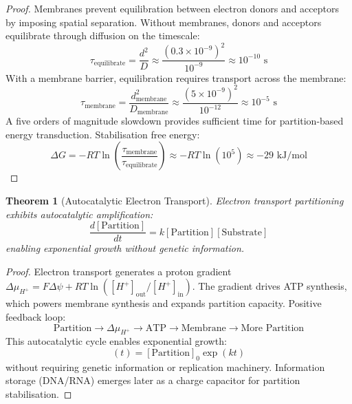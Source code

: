 \documentclass[11pt,a4paper]{article}
\newtheorem{theorem}{Theorem}[section]
\theoremstyle{remark}
\begin{document}
\begin{proof}
Membranes prevent equilibration between electron donors and acceptors by imposing spatial separation. Without membranes, donors and acceptors equilibrate through diffusion on the timescale:
\begin{equation}
\tau_{\text{equilibrate}} = \frac{d^2}{D} \approx \frac{(0.3 \times 10^{-9})^2}{10^{-9}} \approx 10^{-10} \text{ s}
\end{equation}
With a membrane barrier, equilibration requires transport across the membrane:
\begin{equation}
\tau_{\text{membrane}} = \frac{d_{\text{membrane}}^2}{D_{\text{membrane}}} \approx \frac{(5 \times 10^{-9})^2}{10^{-12}} \approx 10^{-5} \text{ s}
\end{equation}
A five orders of magnitude slowdown provides sufficient time for partition-based energy transduction. Stabilisation free energy:
\begin{equation}
\Delta G = -RT\ln\left(\frac{\tau_{\text{membrane}}}{\tau_{\text{equilibrate}}}\right) \approx -RT\ln(10^5) \approx -29 \text{ kJ/mol}
\end{equation}
\end{proof}

\begin{theorem}[Autocatalytic Electron Transport]
\label{thm:autocatalytic}
Electron transport partitioning exhibits autocatalytic amplification:
\begin{equation}
\frac{d[\text{Partition}]}{dt} = k[\text{Partition}][\text{Substrate}]
\end{equation}
enabling exponential growth without genetic information.
\end{theorem}

\begin{proof}
Electron transport generates a proton gradient $\Delta\mu_{H^+} = F\Delta\psi + RT\ln([H^+]_{\text{out}}/[H^+]_{\text{in}})$. The gradient drives ATP synthesis, which powers membrane synthesis and expands partition capacity. Positive feedback loop:
\begin{equation}
\text{Partition} \to \Delta\mu_{H^+} \to \text{ATP} \to \text{Membrane} \to \text{More Partition}
\end{equation}
This autocatalytic cycle enables exponential growth:
\begin{equation}
[\text{Partition}](t) = [\text{Partition}]_0 \exp(kt)
\end{equation}
without requiring genetic information or replication machinery. Information storage (DNA/RNA) emerges later as a charge capacitor for partition stabilisation.
\end{proof}
\end{document}

